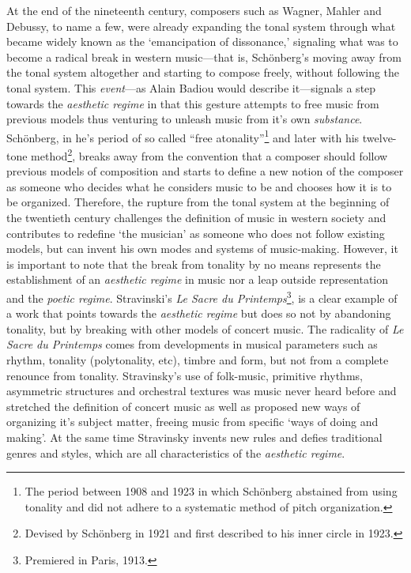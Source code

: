 At the end of the nineteenth century, composers such as Wagner, Mahler and Debussy, to name a few, were already expanding the tonal system through what became widely known as the `emancipation of dissonance,' signaling what was to become a radical break in western music---that is, Sch\"{o}nberg's moving away from the tonal system altogether and starting to compose freely, without following the tonal system. This \emph{event}---as Alain Badiou would describe it---signals a step towards the \emph{aesthetic regime} in that this gesture attempts to free music from previous models thus venturing to unleash music from it's own \emph{substance}. Sch\"{o}nberg, in he's period of so called ``free atonality''\footnote{The period between 1908 and 1923 in which Sch\"{o}nberg abstained from using tonality and did not adhere to a systematic method of pitch organization.} and later with his twelve-tone method\footnote{Devised by Sch\"{o}nberg in 1921 and first described to his inner circle in 1923.}, breaks away from the convention that a composer should follow previous models of composition and starts to define a new notion of the composer as someone who decides what he considers music to be and chooses how it is to be organized. Therefore, the rupture from the tonal system at the beginning of the twentieth century challenges the definition of music in western society and contributes to redefine `the musician' as someone who does not follow existing models, but can invent his own modes and systems of music-making. However, it is important to note that the break from tonality by no means represents the establishment of an \emph{aesthetic regime} in music nor a leap outside representation and the \emph{poetic regime}.  Stravinski's \emph{Le Sacre du Printemps}\footnote{Premiered in Paris, 1913.}, is a clear example of a work that points towards the \emph{aesthetic regime} but does so not by abandoning tonality, but by breaking with other models of concert music. The radicality of \emph{Le Sacre du Printemps} comes from developments in musical parameters such as rhythm, tonality (polytonality, etc), timbre and form, but not from a complete renounce from tonality. Stravinsky's use of folk-music, primitive rhythms, asymmetric structures and orchestral textures was music never heard before and stretched the definition of concert music as well as proposed new ways of organizing it's subject matter, freeing music from specific `ways of doing and making'. At the same time Stravinsky invents new rules and defies traditional genres and styles, which are all characteristics of the \emph{aesthetic regime}. 

